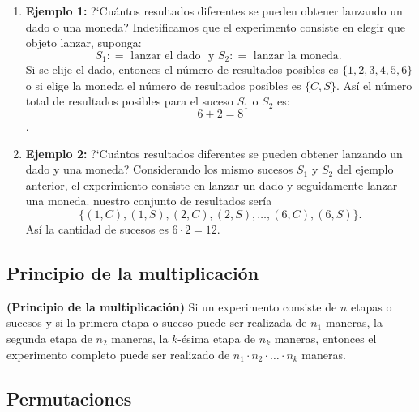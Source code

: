 \begin{example}
    \hspace{0mm}
    \begin{enumerate}[{\rm 1}]
        \item {\bf Ejemplo 1:}  ?`Cu\'antos resultados diferentes se pueden obtener lanzando un dado o una moneda?
        Indetificamos que el experimento consiste en elegir que objeto lanzar, suponga:
        $$ S_1\colon = \text{ lanzar el dado } \text{ y } S_2 \colon = \text{ lanzar la moneda. }$$
        Si se elije el dado, entonces el n\'umero de resultados posibles es $\{1,2,3,4,5,6\}$ o 
        si elige la moneda el n\'umero de resultados posibles es $\{C,S\}$. 
        As\'i el n\'umero total de resultados posibles para el suceso $S_1$ o $S_2$ es: $$6+2=8$$.
        \item {\bf Ejemplo 2:}  ?`Cu\'antos resultados diferentes se pueden obtener lanzando un dado y una moneda?
        Considerando los mismo sucesos $S_1$ y $S_2$ del ejemplo anterior, el experimiento consiste en lanzar un dado y seguidamente lanzar una moneda.
        nuestro conjunto de resultados ser\'ia
        $$ \{ {(1,C), (1,S)}, (2,C), (2,S), \ldots, (6,C), (6,S) \}. $$
        As\'i la cantidad de sucesos es $6\cdot2 = 12.$
        
    \end{enumerate}
\end{example}

\subsection{Principio de la multiplicaci\'on}
\begin{definition}{\bf (Principio de la multiplicaci\'on)}
    Si un experimento consiste de $n$ etapas o sucesos y si la primera etapa o suceso puede ser realizada de $n_{1}$ maneras, la segunda
    etapa de $n_{2}$ maneras, la $k$-\'esima etapa de $n_{k}$ maneras, entonces el experimento completo puede ser realizado
    de $n_{1}\cdot n_{2}\cdot\ldots\cdot n_{k}$ maneras.
\end{definition}


\subsection{Permutaciones}

